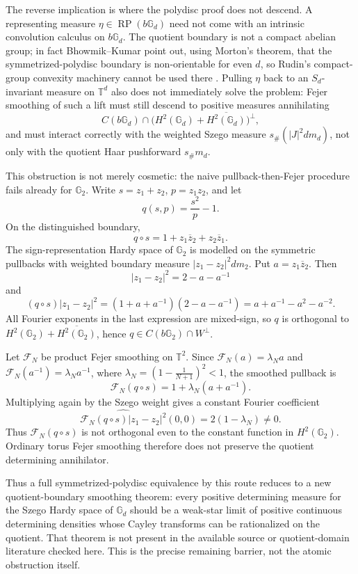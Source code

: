 \documentclass[11pt]{article}
\newcommand{\T}{\mathbb T}
\newcommand{\RP}{\operatorname{RP}}
\begin{document}
The reverse implication is where the polydisc proof does not descend.  A
representing measure \(\eta\in\RP(b\mathbb G_d)\) need not come with an
intrinsic convolution calculus on \(b\mathbb G_d\).  The quotient boundary
is not a compact abelian group; in fact Bhowmik--Kumar point out, using
Morton's theorem, that the symmetrized-polydisc boundary is non-orientable
for even \(d\), so Rudin's compact-group convexity machinery cannot be
used there \cite[p. 10]{BKquot}.  Pulling \(\eta\) back to an
\(S_d\)-invariant measure on \(\T^d\) also does not immediately solve the
problem: Fejer smoothing of such a lift must still descend to positive
measures annihilating
\[
  C(b\mathbb G_d)\cap
  \bigl(H^2(\mathbb G_d)+\overline{H^2(\mathbb G_d)}\bigr)^\perp,
\]
and must interact correctly with the weighted Szego measure
\(s_\#(|J|^2dm_d)\), not only with the quotient Haar pushforward
\(s_\#m_d\).

This obstruction is not merely cosmetic: the naive pullback-then-Fejer
procedure fails already for \(\mathbb G_2\).  Write \(s=z_1+z_2\),
\(p=z_1z_2\), and let
\[
  q(s,p)=\frac{s^2}{p}-1 .
\]
On the distinguished boundary,
\[
  q\circ s=1+z_1\overline z_2+z_2\overline z_1 .
\]
The sign-representation Hardy space of \(\mathbb G_2\) is modelled on
the symmetric pullbacks with weighted boundary measure
\(|z_1-z_2|^2dm_2\).  Put \(a=z_1\overline z_2\).  Then
\[
  |z_1-z_2|^2=2-a-a^{-1}
\]
and
\[
  (q\circ s)|z_1-z_2|^2
  =(1+a+a^{-1})(2-a-a^{-1})
  =a+a^{-1}-a^2-a^{-2}.
\]
All Fourier exponents in the last expression are mixed-sign, so \(q\) is
orthogonal to \(H^2(\mathbb G_2)+\overline{H^2(\mathbb G_2)}\), hence
\(q\in C(b\mathbb G_2)\cap W^\perp\).

Let \(\mathcal F_N\) be product Fejer smoothing on \(\T^2\).  Since
\(\mathcal F_N(a)=\lambda_Na\) and
\(\mathcal F_N(a^{-1})=\lambda_Na^{-1}\), where
\(\lambda_N=(1-\frac1{N+1})^2<1\), the smoothed pullback is
\[
  \mathcal F_N(q\circ s)=1+\lambda_N(a+a^{-1}).
\]
Multiplying again by the Szego weight gives a constant Fourier coefficient
\[
  \widehat{\mathcal F_N(q\circ s)|z_1-z_2|^2}(0,0)
  =2(1-\lambda_N)\neq0 .
\]
Thus \(\mathcal F_N(q\circ s)\) is not orthogonal even to the constant
function in \(H^2(\mathbb G_2)\).  Ordinary torus Fejer smoothing therefore
does not preserve the quotient determining annihilator.

Thus a full symmetrized-polydisc equivalence by this route reduces to a
new quotient-boundary smoothing theorem: every positive determining
measure for the Szego Hardy space of \(\mathbb G_d\) should be a weak-star
limit of positive continuous determining densities whose Cayley transforms
can be rationalized on the quotient.  That theorem is not present in the
available source or quotient-domain literature checked here.  This is the
precise remaining barrier, not the atomic obstruction itself.
\end{document}
